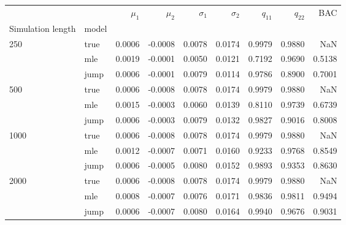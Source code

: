 \begin{tabular}{llrrrrrrr}
\toprule
     &      &  $\mu_1$ &  $\mu_2$ &  $\sigma_1$ &  $\sigma_2$ &  $q_{11}$ &  $q_{22}$ &     BAC \\
Simulation length & model &          &          &             &             &           &           &         \\
\midrule
250  & true &   0.0006 &  -0.0008 &      0.0078 &      0.0174 &    0.9979 &    0.9880 &     NaN \\
     & mle &   0.0019 &  -0.0001 &      0.0050 &      0.0121 &    0.7192 &    0.9690 &  0.5138 \\
     & jump &   0.0006 &  -0.0001 &      0.0079 &      0.0114 &    0.9786 &    0.8900 &  0.7001 \\
500  & true &   0.0006 &  -0.0008 &      0.0078 &      0.0174 &    0.9979 &    0.9880 &     NaN \\
     & mle &   0.0015 &  -0.0003 &      0.0060 &      0.0139 &    0.8110 &    0.9739 &  0.6739 \\
     & jump &   0.0006 &  -0.0003 &      0.0079 &      0.0132 &    0.9827 &    0.9016 &  0.8008 \\
1000 & true &   0.0006 &  -0.0008 &      0.0078 &      0.0174 &    0.9979 &    0.9880 &     NaN \\
     & mle &   0.0012 &  -0.0007 &      0.0071 &      0.0160 &    0.9233 &    0.9768 &  0.8549 \\
     & jump &   0.0006 &  -0.0005 &      0.0080 &      0.0152 &    0.9893 &    0.9353 &  0.8630 \\
2000 & true &   0.0006 &  -0.0008 &      0.0078 &      0.0174 &    0.9979 &    0.9880 &     NaN \\
     & mle &   0.0008 &  -0.0007 &      0.0076 &      0.0171 &    0.9836 &    0.9811 &  0.9494 \\
     & jump &   0.0006 &  -0.0007 &      0.0080 &      0.0164 &    0.9940 &    0.9676 &  0.9031 \\
\bottomrule
\end{tabular}
